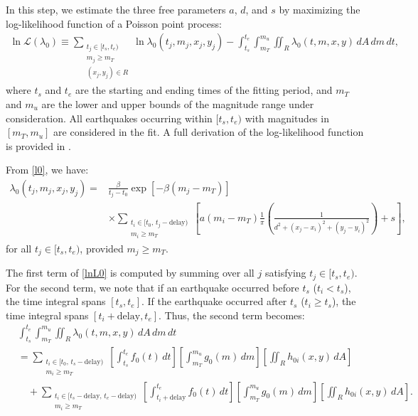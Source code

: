 \documentclass[linenum,doublespace,onecolumn]{SSA-SRL}
\theoremstyle{lemma}
\begin{document}
In this step, we estimate the three free parameters $a$, $d$, and $s$ by maximizing the log-likelihood function of a Poisson point process:
\begin{equation}\label{lnL0}
\begin{aligned}
\ln{\mathcal{L}(\lambda_0)} \equiv \sum_{\substack{t_j \in [t_s,t_e)\\ m_j \geq m_T\\ (x_j,y_j)\in R}} \ln{\lambda_0(t_j,m_j,x_j,y_j)}
- \int_{t_s}^{t_e}\int_{m_T}^{m_u}\iint_{R} \lambda_0(t,m,x,y)\, dA\, dm\, dt,
\end{aligned}
\end{equation}
where $t_s$ and $t_e$ are the starting and ending times of the fitting period, and $m_T$ and $m_u$ are the lower and upper bounds of the magnitude range under consideration. All earthquakes occurring within $[t_s, t_e)$ with magnitudes in $[m_T, m_u]$ are considered in the fit. A full derivation of the log-likelihood function is provided in .

From \eqref{l0}, we have:
\begin{equation}\label{l01}
\begin{aligned}
\lambda_0(t_j, m_j, x_j, y_j) = &\frac{\beta}{t_j - t_0} \exp[-\beta(m_j - m_T)] \\
&\times \sum_{\substack{t_i \in [t_0,\,t_j - \text{delay})\\ m_i \geq m_T}} \left[a(m_i - m_T) \frac{1}{\pi} \left( \frac{1}{d^2 + (x_j - x_i)^2 + (y_j - y_i)^2} \right) + s \right],
\end{aligned}
\end{equation}
for all $t_j \in [t_s, t_e)$, provided $m_j \geq m_T$.

The first term of \eqref{lnL0} is computed by summing over all $j$ satisfying $t_j \in [t_s, t_e)$. For the second term, we note that if an earthquake occurred before $t_s$ ($t_i < t_s$), the time integral spans $[t_s, t_e]$. If the earthquake occurred after $t_s$ ($t_i \geq t_s$), the time integral spans $[t_i + \text{delay}, t_e]$. Thus, the second term becomes:
\begin{equation}\label{l02}
\begin{aligned}
&\int_{t_s}^{t_e} \int_{m_T}^{m_u} \iint_{R} \lambda_0(t,m,x,y)\, dA\, dm\, dt \\
&= \sum_{\substack{t_i \in [t_0,\, t_s - \text{delay})\\ m_i \geq m_T}} 
\left[ \int_{t_s}^{t_e} f_0(t)\, dt \right] 
\left[ \int_{m_T}^{m_u} g_0(m)\, dm \right] 
\left[ \iint_R h_{0i}(x,y)\, dA \right] \\
&\quad + \sum_{\substack{t_i \in [t_s - \text{delay},\, t_e - \text{delay})\\ m_i \geq m_T}} 
\left[ \int_{t_i + \text{delay}}^{t_e} f_0(t)\, dt \right] 
\left[ \int_{m_T}^{m_u} g_0(m)\, dm \right] 
\left[ \iint_R h_{0i}(x,y)\, dA \right].
\end{aligned}
\end{equation}
\end{document}
